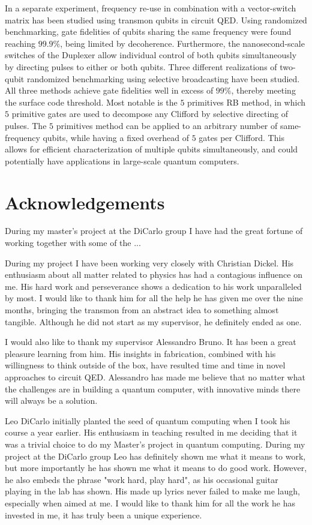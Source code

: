 \documentclass[12pt]{report}
\begin{document}
In a separate experiment, frequency re-use in combination with a vector-switch matrix has been studied using transmon qubits in circuit QED. Using randomized benchmarking, gate fidelities of qubits sharing the same frequency were found reaching $99.9\%$, being limited by decoherence. Furthermore, the nanosecond-scale switches of the Duplexer allow individual control of both qubits simultaneously by directing pulses to either or both qubits. Three different realizations of two-qubit randomized benchmarking using selective broadcasting have been studied. All three methods achieve gate fidelities well in excess of $99\%$, thereby meeting the surface code threshold. Most notable is the $5$ primitives RB method, in which $5$ primitive gates are used to decompose any Clifford by selective directing of pulses. The $5$ primitives method can be applied to an arbitrary number of same-frequency qubits, while having a fixed overhead of $5$ gates per Clifford. This allows for efficient characterization of multiple qubits simultaneously, and could potentially have applications in large-scale quantum computers.

\chapter*{Acknowledgements}

During my master's project at the DiCarlo group I have had the great fortune of working together with some of the ...

During my project I have been working very closely with Christian Dickel. His enthusiasm about all matter related to physics has had a contagious influence on me. His hard work and perseverance shows a dedication to his work unparalleled by most. I would like to thank him for all the help he has given me over the nine months, bringing the transmon from an abstract idea to something almost tangible. Although he did not start as my supervisor, he definitely ended as one.

I would also like to thank my supervisor Alessandro Bruno. It has been a great pleasure learning from him. His insights in fabrication, combined with his willingness to think outside of the box, have resulted time and time in novel approaches to circuit QED. Alessandro has made me believe that no matter what the challenges are in building a quantum computer, with innovative minds there will always be a solution.

Leo DiCarlo initially planted the seed of quantum computing when I took his course a year earlier. His enthusiasm in teaching resulted in me deciding that it was a trivial choice to do my Master's project in quantum computing. During my project at the DiCarlo group Leo has definitely shown me what it means to work, but more importantly he has shown me what it means to do good work. However, he also embeds the phrase "work hard, play hard", as his occasional guitar playing in the lab has shown. His made up lyrics never failed to make me laugh, especially when aimed at me. I would like to thank him for all the work he has invested in me, it has truly been a unique experience.
\end{document}
